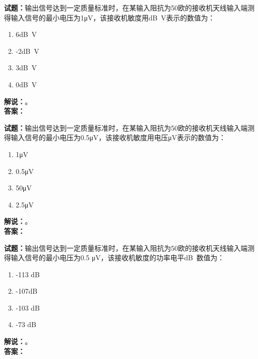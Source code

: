 \documentclass{ctexbook}
\begin{document}
\vspace{\baselineskip}

\noindent\textbf{试题：}输出信号达到一定质量标准时，在某输入阻抗为50欧的接收机天线输入端测得输入信号的最小电压为1μV，该接收机敏度用\unit[qualifier-mode=combine]{\deci\bel{}}V表示的数值为：
\begin{enumerate}[leftmargin=3em]
  \item 6\unit[qualifier-mode=combine]{\deci\bel{}}V
  \item -2\unit[qualifier-mode=combine]{\deci\bel{}}V
  \item 3\unit[qualifier-mode=combine]{\deci\bel{}}V
  \item 0\unit[qualifier-mode=combine]{\deci\bel{}}V
\end{enumerate}
\noindent\textbf{解说：}\textbf{}。\\\noindent\textbf{答案：}

\vspace{\baselineskip}

\noindent\textbf{试题：}输出信号达到一定质量标准时，在某输入阻抗为50欧的接收机天线输入端测得输入信号的最小电压为0.5μV，该接收机敏度用电压μV表示的数值为：
\begin{enumerate}[leftmargin=3em]
  \item 1μV
  \item 0.5μV
  \item 50μV
  \item 2.5μV
\end{enumerate}
\noindent\textbf{解说：}\textbf{}。\\\noindent\textbf{答案：}

\vspace{\baselineskip}

\noindent\textbf{试题：}输出信号达到一定质量标准时，在某输入阻抗为50欧的接收机天线输入端测得输入信号的最小电压为0.5 μV，该接收机敏度的功率电平\unit[qualifier-mode=combine]{\deci\bel{}}数值为：
\begin{enumerate}[leftmargin=3em]
  \item -113 \unit[qualifier-mode=combine]{\deci\bel{}}
  \item -107\unit[qualifier-mode=combine]{\deci\bel{}}
  \item -103 \unit[qualifier-mode=combine]{\deci\bel{}}
  \item -73 \unit[qualifier-mode=combine]{\deci\bel{}}
\end{enumerate}
\noindent\textbf{解说：}\textbf{}。\\\noindent\textbf{答案：}
\end{document}
